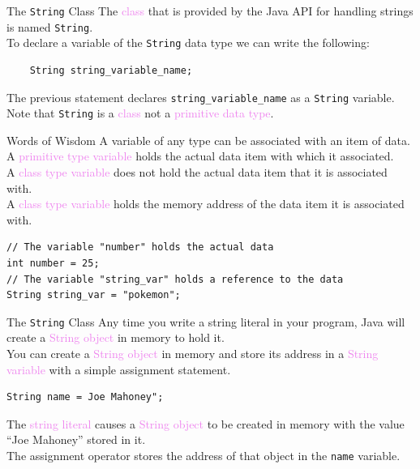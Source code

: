 \documentclass[11pt]{beamer}
\newcommand{\violet}[1]{\textcolor{violet}{#1}}
\begin{document}
\begin{frame}[fragile]{The \texttt{String} Class}
    The \violet{class} that is provided by the Java API for handling strings is named \texttt{String}. \\ \vspace{1em}
    To declare a variable of the \texttt{String} data type we can write the following:
    \begin{lstlisting}
    String string_variable_name;
    \end{lstlisting}
    The previous statement declares \texttt{string\_variable\_name} as a \texttt{String} variable. \\ \vspace{1em}
    Note that \texttt{String} is a \violet{class} not a \violet{primitive data type}.
\end{frame}

\begin{frame}[fragile]{Words of Wisdom}
    A variable of any type can be associated with an item of data. \\ \vspace{1em}
    A \violet{primitive type variable} holds the actual data item with which it associated. \\ \vspace{1em}
    A \violet{class type variable} does not hold the actual data item that it is associated with. \\ \vspace{1em}
    A \violet{class type variable} holds the memory address of the data item it is associated with. \\ \vspace{1em}
    \begin{lstlisting}
// The variable "number" holds the actual data
int number = 25;
// The variable "string_var" holds a reference to the data
String string_var = "pokemon";
    \end{lstlisting}
\end{frame}

\begin{frame}[fragile]{The \texttt{String} Class}
    Any time you write a string literal in your program, Java will create a \violet{String object} in memory to hold it. \\ \vspace{1em}
    You can create a \violet{String object} in memory and store its address in a \violet{String variable} with a simple assignment statement.
    \begin{lstlisting}
String name = Joe Mahoney";
    \end{lstlisting}
    The \violet{string literal} causes a \violet{String object} to be created in memory with the value ``Joe Mahoney'' stored in it. \\ \vspace{1em}
    The assignment operator stores the address of that object in the \texttt{name} variable.
\end{frame}
\end{document}
